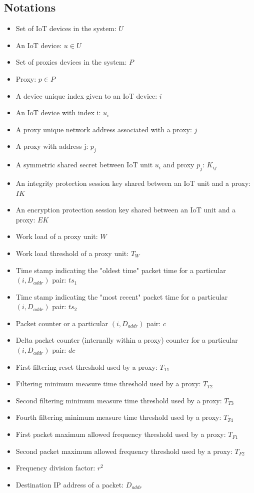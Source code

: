\documentclass[sigplan,screen]{acmart}
\begin{document}
\subsection{Notations}
\begin{itemize}
\item Set of IoT devices in the system: $U$
\item An IoT device: $u \in U$
\item Set of proxies devices in the system: $P$
\item Proxy: $p \in P$
\item A device unique index given to an IoT device: $i$
\item An IoT device with index i: $u_i$
\item A proxy unique network address associated with a proxy: $j$
\item A proxy with address j: $p_j$
\item A symmetric shared secret between IoT unit $u_i$ and proxy $p_j$: $K_{ij}$
\item An integrity protection session key shared between an IoT unit and a proxy: $IK$
\item An encryption protection session key shared between an IoT unit and a proxy: $EK$
\item Work load of a proxy unit: $W$
\item Work load threshold of a proxy unit: $T_W$
\item Time stamp indicating the "oldest time" packet time for a particular $(i,D_{addr})$ pair: $ts_1$
\item Time stamp indicating the "most recent" packet time for a particular $(i,D_{addr})$ pair: $ts_2$
\item Packet counter or a particular $(i,D_{addr})$ pair: $c$
\item Delta packet counter (internally within a proxy) counter for a particular $(i,D_{addr})$ pair: $dc$
\item First filtering reset threshold used by a proxy: $T_{T1}$
\item Filtering minimum measure time threshold used by a proxy: $T_{T2}$
\item Second filtering minimum measure time threshold used by a proxy: $T_{T3}$
\item Fourth filtering minimum measure time threshold used by a proxy: $T_{T4}$
\item First packet maximum allowed frequency threshold used by a proxy: $T_{F1}$
\item Second packet maximum allowed frequency threshold used by a proxy: $T_{F2}$
\item Frequency division factor: $r^2$
\item Destination IP address of a packet: $D_{addr}$
\end{itemize}
\end{document}
